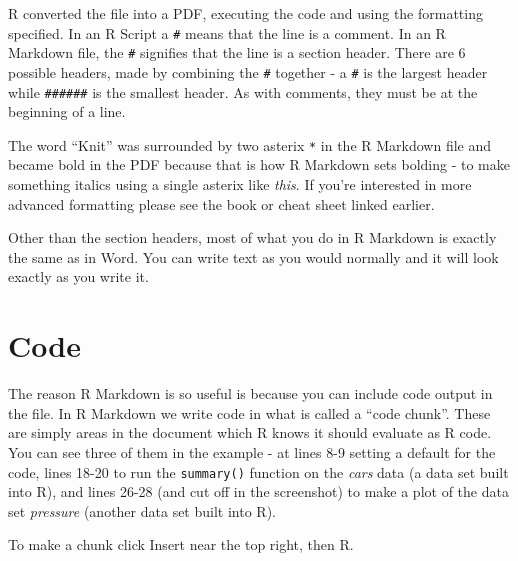 \documentclass[
]{krantz}
\begin{document}
R converted the file into a PDF, executing the code and using the formatting specified. In an R Script a \texttt{\#} means that the line is a comment. In an R Markdown file, the \texttt{\#} signifies that the line is a section header. There are 6 possible headers, made by combining the \texttt{\#} together - a \texttt{\#} is the largest header while \texttt{\#\#\#\#\#\#} is the smallest header. As with comments, they must be at the beginning of a line.

The word ``Knit'' was surrounded by two asterix \texttt{*} in the R Markdown file and became bold in the PDF because that is how R Markdown sets bolding - to make something italics using a single asterix like \emph{this}. If you're interested in more advanced formatting please see the book or cheat sheet linked earlier.

Other than the section headers, most of what you do in R Markdown is exactly the same as in Word. You can write text as you would normally and it will look exactly as you write it.

\hypertarget{code-1}{%
\section{Code}\label{code-1}}

The reason R Markdown is so useful is because you can include code output in the file. In R Markdown we write code in what is called a ``code chunk''. These are simply areas in the document which R knows it should evaluate as R code. You can see three of them in the example - at lines 8-9 setting a default for the code, lines 18-20 to run the \texttt{summary()} function on the \emph{cars} data (a data set built into R), and lines 26-28 (and cut off in the screenshot) to make a plot of the data set \emph{pressure} (another data set built into R).

To make a chunk click Insert near the top right, then R.
\end{document}
